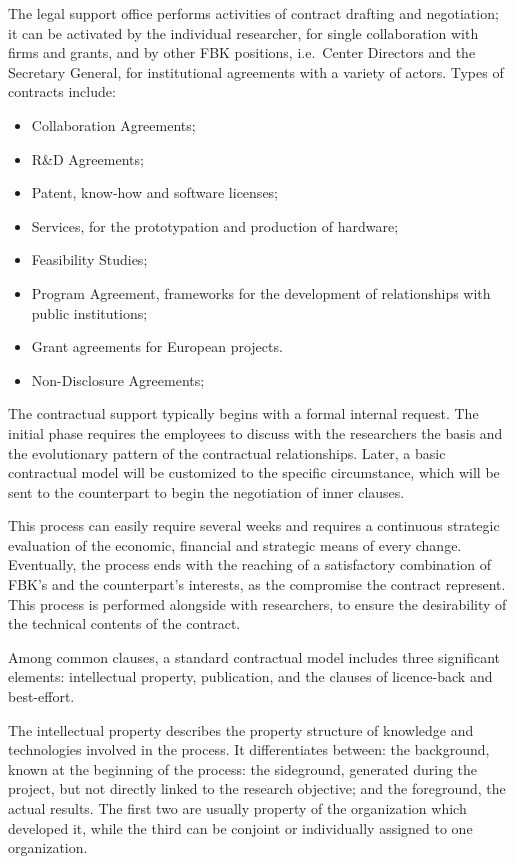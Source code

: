 The legal support office performs activities of contract drafting and negotiation; it can be activated by the individual researcher, for single collaboration with firms and grants, and by other FBK positions, i.e.\ Center Directors and the Secretary General, for institutional agreements with a variety of actors. Types of contracts include:

\begin{itemize}

\item Collaboration Agreements; 
\item R\&D Agreements; 
\item Patent, know-how and software licenses; 
\item Services, for the prototypation and production of hardware;
\item Feasibility Studies; 
\item Program Agreement, frameworks for the development of relationships with public institutions; 
\item Grant agreements for European projects. 
\item Non-Disclosure Agreements; 

\end{itemize}

The contractual support typically begins with a formal internal request. The initial phase requires the employees to discuss with the researchers the basis and the evolutionary pattern of the contractual relationships. Later, a basic contractual model will be customized to the specific circumstance, which will be sent to the counterpart to begin the negotiation of inner clauses. 
 
This process can easily require several weeks and requires a continuous strategic evaluation of the economic, financial and strategic means of every change. Eventually, the process ends with the reaching of a satisfactory combination of FBK’s and the counterpart’s interests, as the compromise the contract represent. This process is performed alongside with researchers, to ensure the desirability of the technical contents of the contract.

Among common clauses, a standard contractual model includes three significant elements: intellectual property, publication, and the clauses of licence-back and best-effort.

The intellectual property describes the property structure of knowledge and technologies involved in the process. It differentiates between: the background, known at the beginning of the process: the sideground, generated during the project, but not directly linked to the research objective; and the foreground, the actual results. The first two are usually property of the organization which developed it, while the third can be conjoint or individually assigned to one organization. 

